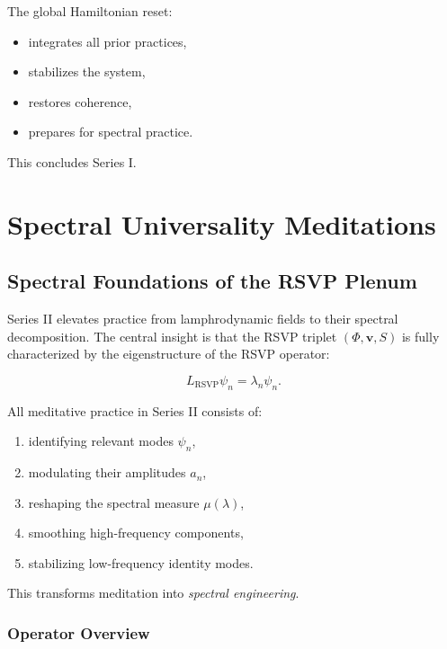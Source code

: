 \documentclass[12pt]{article}
\begin{document}
The global Hamiltonian reset:

\begin{itemize}
    \item integrates all prior practices,
    \item stabilizes the system,
    \item restores coherence,
    \item prepares for spectral practice.
\end{itemize}

This concludes Series I.


\part{Spectral Universality Meditations}
\chapter{Spectral Foundations of the RSVP Plenum}

Series II elevates practice from lamphrodynamic fields to their spectral
decomposition. The central insight is that the RSVP triplet
$(\Phi,\mathbf{v},S)$ is fully characterized by the eigenstructure of the
RSVP operator:

\[
L_{\text{RSVP}} \psi_n = \lambda_n \psi_n.
\]

All meditative practice in Series II consists of:

\begin{enumerate}
    \item identifying relevant modes $\psi_n$,
    \item modulating their amplitudes $a_n$,
    \item reshaping the spectral measure $\mu(\lambda)$,
    \item smoothing high-frequency components,
    \item stabilizing low-frequency identity modes.
\end{enumerate}

This transforms meditation into \emph{spectral engineering}.

\section{Operator Overview}
\end{document}
